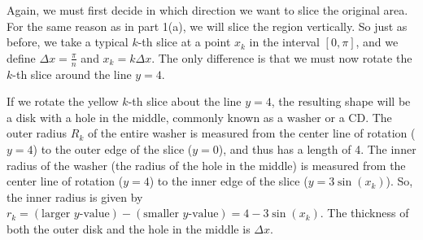 \documentclass[main]{subfiles}
\begin{document}
\begin{enumerate}
\begin{enumerate}
\begin{enumerate}
\begin{solution}

Again, we must first decide in which direction we want to slice the original area. For the same reason as in part 1(a), we will slice the region vertically. So just as before, we take a typical $k$-th slice at a point $x_k$ in the interval $[0,\pi]$, and we define $\Delta x = \frac{\pi}{n}$ and $x_k=k\Delta x$. The only difference is that we must now rotate the $k$-th slice around the line $y=4$.

\begin{center}
\end{center}

If we rotate the yellow $k$-th slice about the line $y=4$, the resulting shape will be a disk with a hole in the middle, commonly known as a $\boxed{\text{washer}}$ or a $\boxed{\text{CD}}$. The outer radius $R_k$ of the entire washer is measured from the center line of rotation ($y=4$) to the outer edge of the slice ($y=0$), and thus has a length of 4. The inner radius of the washer (the radius of the hole in the middle) is measured from the center line of rotation ($y=4$) to the inner edge of the slice ($y=3\sin(x_k)$). So, the inner radius is given by $r_k=(\text{larger $y$-value})-(\text{smaller $y$-value})=4-3\sin(x_k)$. The thickness of both the outer disk and the hole in the middle is $\Delta x$.


\end{solution}
\end{enumerate}
\end{enumerate}
\end{enumerate}
\end{document}
